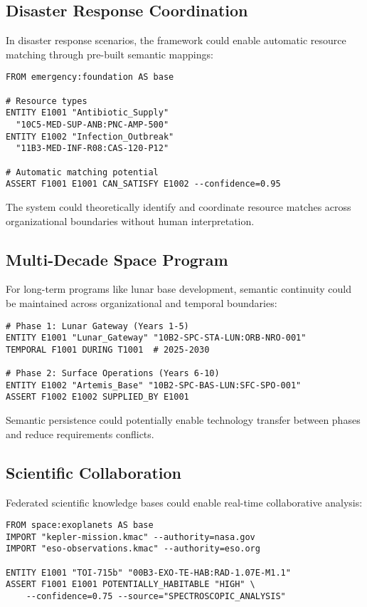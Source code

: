 \documentclass[conference]{IEEEtran}
\begin{document}
\subsection{Disaster Response Coordination}

In disaster response scenarios, the framework could enable automatic resource matching through pre-built semantic mappings:

\begin{lstlisting}[caption=Disaster Response Semantics]
FROM emergency:foundation AS base

# Resource types
ENTITY E1001 "Antibiotic_Supply" 
  "10C5-MED-SUP-ANB:PNC-AMP-500"
ENTITY E1002 "Infection_Outbreak" 
  "11B3-MED-INF-R08:CAS-120-P12"

# Automatic matching potential
ASSERT F1001 E1001 CAN_SATISFY E1002 --confidence=0.95
\end{lstlisting}

The system could theoretically identify and coordinate resource matches across organizational boundaries without human interpretation.

\subsection{Multi-Decade Space Program}

For long-term programs like lunar base development, semantic continuity could be maintained across organizational and temporal boundaries:

\begin{lstlisting}[caption=Long-Term Program Semantics]
# Phase 1: Lunar Gateway (Years 1-5)
ENTITY E1001 "Lunar_Gateway" "10B2-SPC-STA-LUN:ORB-NRO-001"
TEMPORAL F1001 DURING T1001  # 2025-2030

# Phase 2: Surface Operations (Years 6-10)  
ENTITY E1002 "Artemis_Base" "10B2-SPC-BAS-LUN:SFC-SPO-001"
ASSERT F1002 E1002 SUPPLIED_BY E1001
\end{lstlisting}

Semantic persistence could potentially enable technology transfer between phases and reduce requirements conflicts.

\subsection{Scientific Collaboration}

Federated scientific knowledge bases could enable real-time collaborative analysis:

\begin{lstlisting}[caption=Federated Scientific Knowledge]
FROM space:exoplanets AS base
IMPORT "kepler-mission.kmac" --authority=nasa.gov
IMPORT "eso-observations.kmac" --authority=eso.org

ENTITY E1001 "TOI-715b" "00B3-EXO-TE-HAB:RAD-1.07E-M1.1"
ASSERT F1001 E1001 POTENTIALLY_HABITABLE "HIGH" \
    --confidence=0.75 --source="SPECTROSCOPIC_ANALYSIS"
\end{lstlisting}
\end{document}
